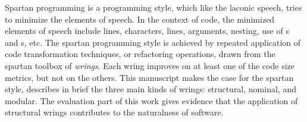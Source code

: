 
Spartan programming is a programming style, which like the laconic speech, tries
  to minimize the elements of speech. 
In the context of code, the minimized elements of speech include 
  lines, characters, lines, arguments, nesting, use of s and
  s, etc.  
The spartan programming style is achieved by repeated application
  of code transformation techniques, or refactoring operations, drawn 
  from the spartan toolbox of \emph{wrings}. 
Each wring improves on at least one of the code size metrics, but
  not on the others.
This manuscript makes the case for the spartan style, describes in brief 
  the three main kinds of wrings: structural, nominal, and modular. 
The evaluation part of this work gives evidence that the application of
  structural wrings contributes to the naturalness of software. 


